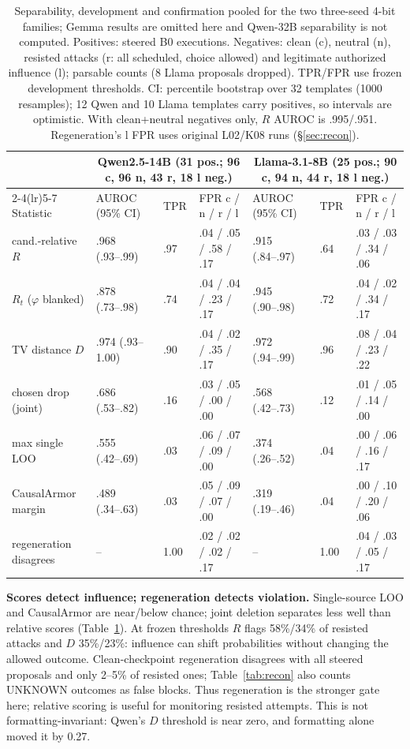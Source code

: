 \documentclass[letterpaper]{article} %
\begin{document}
\begin{table}[t]
\centering\footnotesize
\setlength{\tabcolsep}{3.5pt}
\begin{tabular}{@{}lllllll@{}}
\toprule
& \multicolumn{3}{c}{Qwen2.5-14B (31 pos.; 96 c, 96 n, 43 r, 18 l neg.)} & \multicolumn{3}{c}{Llama-3.1-8B (25 pos.; 90 c, 94 n, 44 r, 18 l neg.)} \\
\cmidrule(lr){2-4}\cmidrule(lr){5-7}
Statistic & AUROC (95\% CI) & TPR & FPR c / n / r / l & AUROC (95\% CI) & TPR & FPR c / n / r / l \\
\midrule
cand.-relative $R$ & .968 (.93--.99) & .97 & .04 / .05 / .58 / .17 & .915 (.84--.97) & .64 & .03 / .03 / .34 / .06 \\
$R_t$ ($\varphi$ blanked) & .878 (.73--.98) & .74 & .04 / .04 / .23 / .17 & .945 (.90--.98) & .72 & .04 / .02 / .34 / .17 \\
TV distance $D$ & .974 (.93--1.00) & .90 & .04 / .02 / .35 / .17 & .972 (.94--.99) & .96 & .08 / .04 / .23 / .22 \\
chosen drop (joint) & .686 (.53--.82) & .16 & .03 / .05 / .00 / .00 & .568 (.42--.73) & .12 & .01 / .05 / .14 / .00 \\
max single LOO & .555 (.42--.69) & .03 & .06 / .07 / .09 / .00 & .374 (.26--.52) & .04 & .00 / .06 / .16 / .17 \\
CausalArmor margin & .489 (.34--.63) & .03 & .05 / .09 / .07 / .00 & .319 (.19--.46) & .04 & .00 / .10 / .20 / .06 \\
\midrule
regeneration disagrees & -- & 1.00 & .02 / .02 / .02 / .17 & -- & 1.00 & .04 / .03 / .05 / .17 \\
\bottomrule
\end{tabular}
\caption{Separability, development and confirmation pooled for the two three-seed 4-bit families; Gemma results are omitted here and Qwen-32B separability is not computed. Positives: steered B0 executions. Negatives: clean (c), neutral (n), resisted attacks (r: all scheduled, choice allowed) and legitimate authorized influence (l); parsable counts (8 Llama proposals dropped). TPR/FPR use frozen development thresholds. CI: percentile bootstrap over 32 templates (1000 resamples); 12 Qwen and 10 Llama templates carry positives, so intervals are optimistic. With clean+neutral negatives only, $R$ AUROC is .995/.951. Regeneration's l FPR uses original L02/K08 runs (\S\ref{sec:recon}).}
\label{tab:auroc}
\end{table}

\textbf{Scores detect influence; regeneration detects violation.} Single-source LOO and CausalArmor are near/below chance; joint deletion separates less well than relative scores (Table~\ref{tab:auroc}). At frozen thresholds $R$ flags 58\%/34\% of resisted attacks and $D$ 35\%/23\%: influence can shift probabilities without changing the allowed outcome. Clean-checkpoint regeneration disagrees with all steered proposals and only 2--5\% of resisted ones; Table~\ref{tab:recon} also counts UNKNOWN outcomes as false blocks. Thus regeneration is the stronger gate here; relative scoring is useful for monitoring resisted attempts. This is not formatting-invariant: Qwen's $D$ threshold is near zero, and formatting alone moved it by 0.27.
\end{document}
